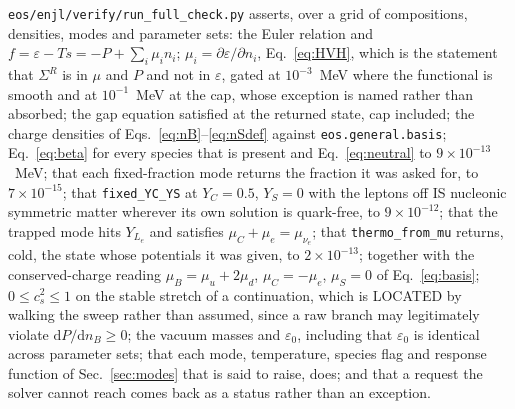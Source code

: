 \documentclass[aps,prc,onecolumn,superscriptaddress,nofootinbib,10pt]{revtex4-2}
\newcommand{\nB}{n_B}
\newcommand{\muB}{\mu_B}
\newcommand{\muC}{\mu_C}
\newcommand{\muS}{\mu_S}
\newcommand{\SR}{\Sigma^{R}}
\begin{document}
\texttt{eos/enjl/verify/run\_full\_check.py} asserts, over a grid of
compositions, densities, modes and parameter sets: the Euler relation and
$f = \varepsilon - Ts = -P + \sum_i \mu_i n_i$;
$\mu_i = \partial\varepsilon/\partial n_i$, Eq.~\eqref{eq:HVH}, which is the
statement that $\SR$ is in $\mu$ and $P$ and not in $\varepsilon$, gated at
$10^{-3}$~MeV where the functional is smooth and at $10^{-1}$~MeV at the cap,
whose exception is named rather than absorbed; the gap equation satisfied at
the returned state, cap included; the charge densities of
Eqs.~\eqref{eq:nB}--\eqref{eq:nSdef} against \texttt{eos.general.basis};
Eq.~\eqref{eq:beta} for every species that is present and
Eq.~\eqref{eq:neutral} to $9\times10^{-13}$~MeV; that each fixed-fraction
mode returns the fraction it was asked for, to $7\times10^{-15}$; that
\texttt{fixed\_YC\_YS} at $Y_C = 0.5$, $Y_S = 0$ with the leptons off IS
nucleonic symmetric matter wherever its own solution is quark-free, to
$9\times10^{-12}$; that the trapped mode hits $Y_{L_e}$ and satisfies
$\muC + \mu_e = \mu_{\nu_e}$; that \texttt{thermo\_from\_mu} returns, cold,
the state whose potentials it was given, to $2\times10^{-13}$; together with
the
conserved-charge reading $\muB = \mu_u + 2\mu_d$, $\muC = -\mu_e$, $\muS = 0$
of Eq.~\eqref{eq:basis}; $0 \le c_s^2 \le 1$ on the stable stretch of a
continuation, which is LOCATED by walking the sweep rather than assumed, since
a raw branch may legitimately violate $\mathrm{d}P/\mathrm{d}\nB \ge 0$; the
vacuum masses and $\varepsilon_0$, including that $\varepsilon_0$ is identical
across parameter sets; that each mode, temperature, species flag and response
function of Sec.~\ref{sec:modes} that is said to raise, does; and that a
request the solver cannot reach comes back as a status rather than an
exception.


\end{document}
